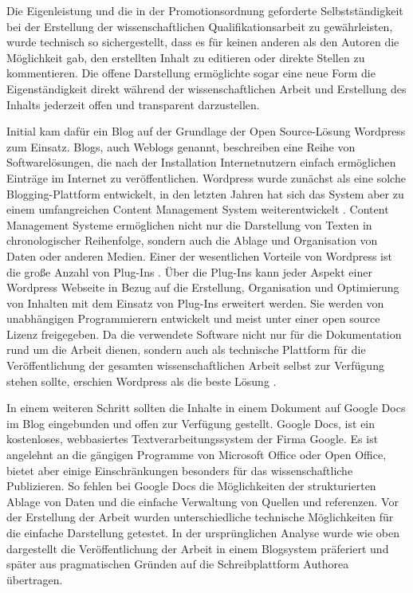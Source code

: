 Die Eigenleistung und die in der Promotionsordnung geforderte \cite{promotionsordnung_leuphana_kuwi_2011} Selbstständigkeit bei der Erstellung der wissenschaftlichen Qualifikationsarbeit zu gewährleisten, wurde technisch so sichergestellt, dass es für keinen anderen als den Autoren die Möglichkeit gab, den erstellten Inhalt zu editieren oder direkte Stellen zu kommentieren. Die offene Darstellung ermöglichte sogar eine neue Form die Eigenständigkeit direkt während der wissenschaftlichen Arbeit und Erstellung des Inhalts jederzeit offen und transparent darzustellen.

Initial kam dafür ein Blog auf der Grundlage der Open Source-Lösung Wordpress zum Einsatz. Blogs, auch Weblogs genannt, beschreiben eine Reihe von Softwarelösungen, die nach der Installation Internetnutzern einfach ermöglichen Einträge im Internet zu veröffentlichen. Wordpress wurde zunächst als eine solche Blogging-Plattform entwickelt, in den letzten Jahren hat sich das System aber zu einem umfangreichen Content Management System weiterentwickelt \cite{Patel_2011_cms}. Content Management Systeme ermöglichen nicht nur die Darstellung von Texten in chronologischer Reihenfolge, sondern auch die Ablage und Organisation von Daten oder anderen Medien. Einer der wesentlichen Vorteile von Wordpress ist die große Anzahl von Plug-Ins \cite{Patel_2011_cms}. Über die Plug-Ins kann jeder Aspekt einer Wordpress Webseite in Bezug auf die Erstellung, Organisation und Optimierung von Inhalten mit dem Einsatz von Plug-Ins erweitert werden. Sie werden von unabhängigen Programmierern entwickelt und meist unter einer open source Lizenz freigegeben. Da die verwendete Software nicht nur für die Dokumentation rund um die Arbeit dienen, sondern auch als technische Plattform für die Veröffentlichung der gesamten wissenschaftlichen Arbeit selbst zur Verfügung stehen sollte, erschien Wordpress als die beste Lösung \cite{Jones_2013_CMS}.

In einem weiteren Schritt sollten die Inhalte in einem Dokument auf Google Docs im Blog eingebunden und offen zur Verfügung gestellt. Google Docs, ist ein kostenloses, webbasiertes Textverarbeitungssystem der Firma Google. Es ist angelehnt an die gängigen Programme von Microsoft Office oder Open Office, bietet aber einige Einschränkungen besonders für das wissenschaftliche Publizieren. So fehlen bei Google Docs die Möglichkeiten der strukturierten Ablage von Daten und die einfache Verwaltung von Quellen und referenzen. Vor der Erstellung der Arbeit wurden unterschiedliche technische Möglichkeiten für die einfache Darstellung getestet. In der ursprünglichen Analyse wurde wie oben dargestellt die Veröffentlichung der Arbeit in einem Blogsystem präferiert und später aus pragmatischen Gründen auf die Schreibplattform Authorea übertragen.


